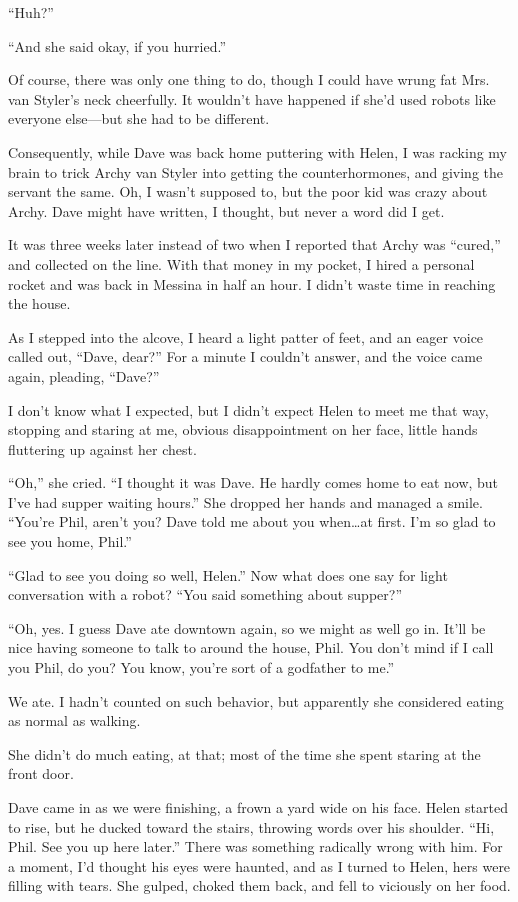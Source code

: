 \documentclass{article}
\begin{document}
“Huh?”

“And she said okay, if you hurried.”

Of course, there was only one thing to do, though I could have wrung fat Mrs. van Styler’s neck cheerfully. It wouldn’t have happened if she’d used robots like everyone else—but she had to be different.

Consequently, while Dave was back home puttering with Helen, I was racking my brain to trick Archy van Styler into getting the counterhormones, and giving the servant the same. Oh, I wasn’t supposed to, but the poor kid was crazy about Archy. Dave might have written, I thought, but never a word did I get.

It was three weeks later instead of two when I reported that Archy was “cured,” and collected on the line. With that money in my pocket, I hired a personal rocket and was back in Messina in half an hour. I didn’t waste time in reaching the house.

As I stepped into the alcove, I heard a light patter of feet, and an eager voice called out, “Dave, dear?” For a minute I couldn’t answer, and the voice came again, pleading, “Dave?”

I don’t know what I expected, but I didn’t expect Helen to meet me that way, stopping and staring at me, obvious disappointment on her face, little hands fluttering up against her chest.

“Oh,” she cried. “I thought it was Dave. He hardly comes home to eat now, but I’ve had supper waiting hours.” She dropped her hands and managed a smile. “You’re Phil, aren’t you? Dave told me about you when…at first. I’m so glad to see you home, Phil.”

“Glad to see you doing so well, Helen.” Now what does one say for light conversation with a robot? “You said something about supper?”

“Oh, yes. I guess Dave ate downtown again, so we might as well go in. It’ll be nice having someone to talk to around the house, Phil. You don’t mind if I call you Phil, do you? You know, you’re sort of a godfather to me.”

We ate. I hadn’t counted on such behavior, but apparently she considered eating as normal as walking.

She didn’t do much eating, at that; most of the time she spent staring at the front door.

Dave came in as we were finishing, a frown a yard wide on his face. Helen started to rise, but he ducked toward the stairs, throwing words over his shoulder. “Hi, Phil. See you up here later.” There was something radically wrong with him. For a moment, I’d thought his eyes were haunted, and as I turned to Helen, hers were filling with tears. She gulped, choked them back, and fell to viciously on her food.
\end{document}
